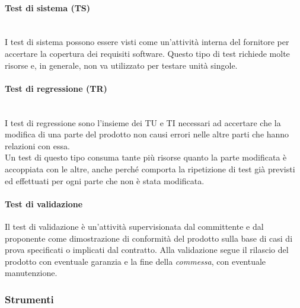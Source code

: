 		\paragraph{Test di sistema (TS)}
		~\\I test di sistema possono essere visti come un'attività interna del fornitore
		per accertare la copertura dei requisiti software.
		\newline{}Questo tipo di test richiede molte risorse e, in generale, non va utilizzato per testare
		unità singole.
		\paragraph{Test di regressione (TR)}
		~\\I test di regressione sono l'insieme dei TU e TI necessari ad accertare che la modifica
		di una parte del prodotto non causi errori nelle altre parti che hanno relazioni con essa.
		\\Un test di questo tipo consuma tante più risorse quanto la parte modificata è accoppiata con le altre, 
		anche perché comporta la ripetizione di test già previsti ed effettuati per ogni parte che non è 
		stata modificata.
		\paragraph{Test di validazione}
		Il test di validazione è un'attività supervisionata dal committente e dal proponente come dimostrazione di conformità del prodotto sulla base 
		di casi di prova specificati o implicati dal contratto.
		Alla validazione segue il rilascio del prodotto con eventuale garanzia e la fine della
		\emph{commessa},	con eventuale manutenzione.
	
	\subsubsection{Strumenti}
